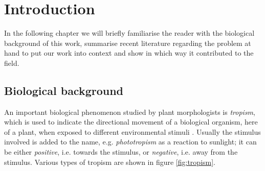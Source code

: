 

\chapter{Introduction} %

\label{introduction} %


\newcommand{\keyword}[1]{\textbf{#1}}
\newcommand{\tabhead}[1]{\textbf{#1}}
\newcommand{\code}[1]{\texttt{#1}}
\newcommand{\file}[1]{\texttt{\bfseries#1}}
\newcommand{\option}[1]{\texttt{\itshape#1}}



In the following chapter we will briefly familiarise the reader with the biological background of this work, summarise recent literature regarding the problem at hand to put our work into context and show in which way it contributed to the field.

\section{Biological background}

An important biological phenomenon studied by plant morphologists is \textit{tropism}, which is used to indicate the directional movement of a biological organism, here of a plant, when exposed to different environmental stimuli \cite{vandenbrink2014light}. Usually the stimulus involved is added to the name, e.g. \textit{phototropism} as a reaction to sunlight; it can be either \textit{positive}, i.e. towards the stimulus, or \textit{negative}, i.e. away from the stimulus. 
Various types of tropism are shown in figure \ref{fig:tropism}.

